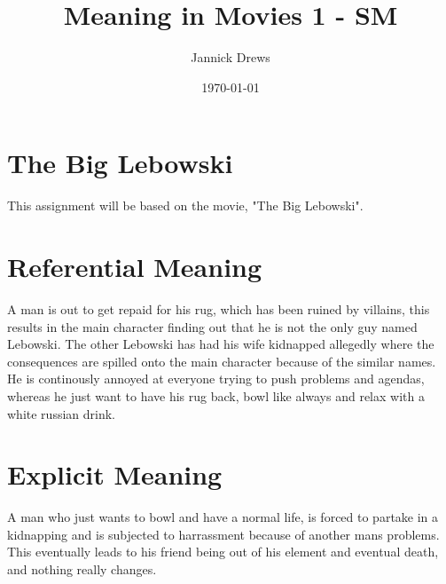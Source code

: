 \documentclass{article}
\title{Meaning in Movies 1 - SM}
\author{Jannick Drews}
\date{\today}
\begin{document}
\maketitle
\newpage




\section*{The Big Lebowski}
\label{sec:title}
This assignment will be based on the movie, "The Big Lebowski".
\section*{Referential Meaning}
A man is out to get repaid for his rug, which has been ruined by villains, this results in the main character finding out that he is not the only guy named Lebowski. The other Lebowski has had his wife kidnapped allegedly where the consequences are spilled onto the main character because of the similar names. He is continously annoyed at everyone trying to push problems and agendas, whereas he just want to have his rug back, bowl like always and relax with a white russian drink.

\section*{Explicit Meaning}
A man who just wants to bowl and have a normal life, is forced to partake in a kidnapping and is subjected to harrassment because of another mans problems. This eventually leads to his friend being out of his element and eventual death, and nothing really changes.
\end{document}
